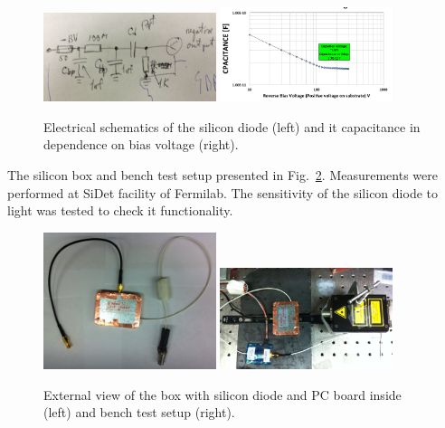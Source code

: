 \documentclass[12pt]{article}
\begin{document}
{\begin{figure}[htbp] 
\centering
\includegraphics[width=0.45\textwidth]{plots/SiliconDiodeDiagram.png} 
\includegraphics[width=0.45\textwidth]{plots/SiliconDiodeCV.png} 
\caption{Electrical schematics of the silicon diode (left) and it capacitance in dependence on bias voltage (right). } 
\label{fig:SiliconDiode} 
\end{figure} 
The silicon box and bench test setup presented in Fig.~\ref{fig:SiliconPad}. Measurements were performed at SiDet facility of Fermilab. The sensitivity of the silicon diode to light was tested to check it functionality.\begin{figure}[htbp] 
\centering
\includegraphics[width=0.45\textwidth]{plots/SiliconPadExternalView.png} 
\includegraphics[width=0.45\textwidth]{plots/SiliconPadBench.png} 
\caption{External view of the box with silicon diode and PC board inside (left) and bench test setup (right).} 
\label{fig:SiliconPad} 
\end{figure} 

}
\end{document}
